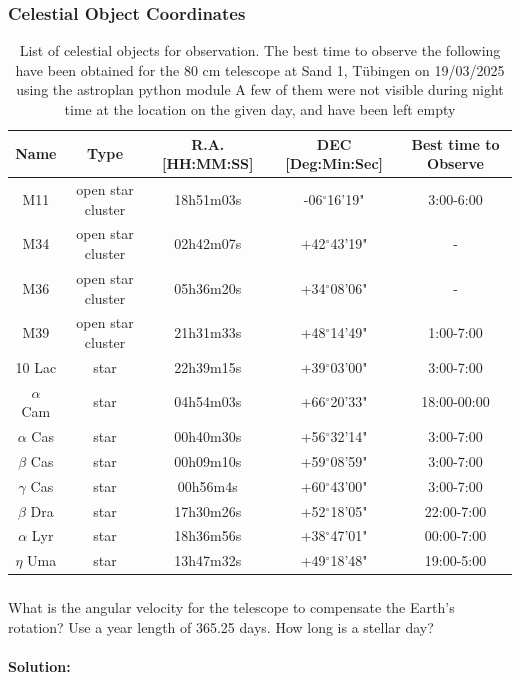 \documentclass[12pt,a4paper]{article}
\begin{document}
  \subsubsection*{Celestial Object Coordinates}
  \begin{table}[H]
    \begin{tabular}{||c|c|c|c|c||}
      \hline
      Name & Type  & R.A. [HH:MM:SS] & DEC [Deg:Min:Sec]& Best time to Observe\\
      \hline
      \hline
        M11 &open star cluster&18h51m03s&-06$^\circ$16'19"& 3:00-6:00  \\
        M34 &open star cluster&02h42m07s&+42$^\circ$43'19"& - \\
        M36 &open star cluster&05h36m20s&+34$^\circ$08'06"& -\\
        M39 &open star cluster&21h31m33s&+48$^\circ$14'49"& 1:00-7:00 \\
        10 Lac& star&22h39m15s&+39$^\circ$03'00"&  3:00-7:00\\
        $\alpha$ Cam &star&04h54m03s&+66$^\circ$20'33"& 18:00-00:00 \\
        $\alpha$ Cas &star&00h40m30s&+56$^\circ$32'14"& 3:00-7:00 \\
        $\beta$ Cas &star&00h09m10s&+59$^\circ$08'59"& 3:00-7:00 \\
        $\gamma$ Cas &star&00h56m4s&+60$^\circ$43'00"& 3:00-7:00 \\
        $\beta$ Dra &star&17h30m26s&+52$^\circ$18'05"& 22:00-7:00 \\
        $\alpha$ Lyr &star&18h36m56s&+38$^\circ$47'01"& 00:00-7:00 \\
        $\eta$ Uma &star&13h47m32s&+49$^\circ$18'48"&  19:00-5:00\\
      \hline
    \end{tabular}
    \caption{List of celestial objects for observation. The best time to observe the following have been obtained for the 80 cm telescope at Sand 1, Tübingen on 19/03/2025 using the astroplan python module \cite{2018AJ....155..128M}
              A few of them were not visible during night time at the location on the given day, and have been left empty}
  \end{table} 



\subsubsection*{}
What is the angular velocity for the telescope to compensate the Earth's rotation? Use a year length of 365.25 days. How long is a stellar day? \\
\\ \textbf{Solution:} \\
\end{document}
